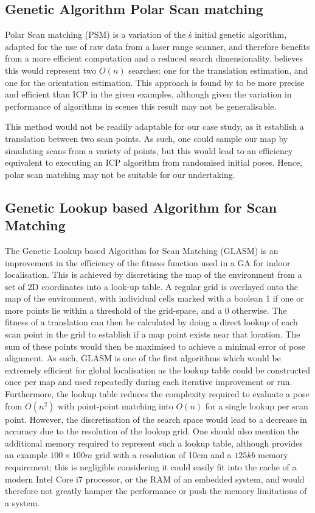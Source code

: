 \documentclass[authoryearcitations]{UoYCSproject}
\begin{document}
\subsection{Genetic Algorithm Polar Scan matching}
Polar Scan matching (PSM) is a variation of the \citeauthor{Robertson2002-ou}\'s initial genetic algorithm, adapted for the use of raw data from a laser range scanner, and therefore benefits from a more efficient computation and a reduced search dimensionality. \citet{Ze-Su2007-li} believes this would represent two $O(n)$ searches: one for the translation estimation, and one for the orientation estimation. This approach is found by \citeauthor{Ze-Su2007-li} to be more precise and efficient than ICP in the given examples, although given the variation in performance of algorithms in scenes \cite{Donoso2017-wp} this result may not be generalisable. 

This method would not be readily adaptable for our case study, as it establish a translation between two scan points. As such, one could sample our map by simulating scans from a variety of points, but this would lead to an efficiency equivalent to executing an ICP algorithm from randomised initial poses. Hence, polar scan matching may not be suitable for our undertaking.

\subsection{Genetic Lookup based Algorithm for Scan Matching}
The Genetic Lookup based Algorithm for Scan Matching (GLASM) \cite{Lenac2007-xm} is an improvement in the efficiency of the fitness function used in a GA for indoor localisation. This is achieved by discretising the map of the environment from a set of 2D coordinates into a look-up table. A regular grid is overlayed onto the map of the environment, with individual cells marked with a boolean 1 if one or more points lie within a threshold of the grid-space, and a 0 otherwise. The fitness of a translation can then be calculated by doing a direct lookup of each scan point in the grid to establish if a map point exists near that location. The sum of these points would then be maximised to achieve a minimal error of pose alignment. As such, GLASM is one of the first algorithms which would be extremely efficient for global localisation as the lookup table could be constructed once per map and used repeatedly during each iterative improvement or run. Furthermore, the lookup table reduces the complexity required to evaluate a pose from $O(n^2)$ with point-point matching into $O(n)$ for a single lookup per scan point. However, the discretisation of the search space would lead to a decrease in accuracy due to the resolution of the lookup grid. One should also mention the additional memory required to represent such a lookup table, although \citeauthor{Lenac2007-xm} provides an example $100\times100m$ grid with a resolution of 10cm and a $125kb$ memory requirement; this is negligible considering it could easily fit into the cache of a modern Intel Core i7 processor, or the RAM of an embedded system, and would therefore not greatly hamper the performance or push the memory limitations of a system. 
\end{document}
